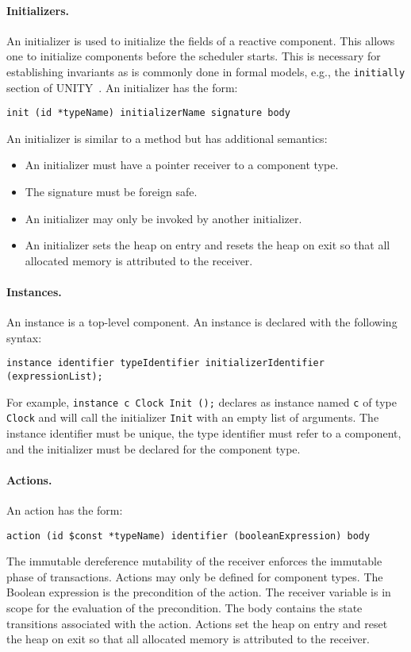 \paragraph{Initializers.}
An initializer is used to initialize the fields of a reactive component.
This allows one to initialize components before the scheduler starts.
This is necessary for establishing invariants as is commonly done in formal models, e.g., the \verb+initially+ section of UNITY~\cite{chandy1989parallel}.
An initializer has the form:
\begin{verbatim}
init (id *typeName) initializerName signature body
\end{verbatim}
An initializer is similar to a method but has additional semantics:
\begin{itemize}
\item An initializer must have a pointer receiver to a component type.
\item The signature must be foreign safe.
\item An initializer may only be invoked by another initializer.
\item An initializer sets the heap on entry and resets the heap on exit so that all allocated memory is attributed to the receiver.
\end{itemize}

\paragraph{Instances.}
An instance is a top-level component.
An instance is declared with the following syntax:
\begin{verbatim}
instance identifier typeIdentifier initializerIdentifier (expressionList);
\end{verbatim}
For example, \verb+instance c Clock Init ();+ declares as instance named \verb+c+ of type \verb+Clock+ and will call the initializer \verb+Init+ with an empty list of arguments.
The instance identifier must be unique, the type identifier must refer to a component, and the initializer must be declared for the component type.

\paragraph{Actions.}
An action has the form:
\begin{verbatim}
action (id $const *typeName) identifier (booleanExpression) body
\end{verbatim}
The immutable dereference mutability of the receiver enforces the immutable phase of transactions.
Actions may only be defined for component types.
The Boolean expression is the precondition of the action.
The receiver variable is in scope for the evaluation of the precondition.
The body contains the state transitions associated with the action.
Actions set the heap on entry and reset the heap on exit so that all allocated memory is attributed to the receiver.

